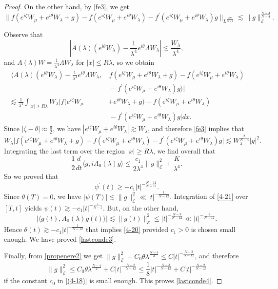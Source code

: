 \documentclass[10pt,a4paper]{amsart}
\begin{document}
\begin{proof}
On the other hand, by \eqref{fe3}, we get
$$\|f(e^{i\zeta}W_\mu +e^{i\theta} W_\lambda +g) - f (e^{i\zeta}W_\mu +e^{i\theta} W_\lambda) - f^\prime (e^{i\zeta} W_\mu +e^{i\theta} W_\lambda) g \|_{L^{\frac{2N}{N+4}}} \lesssim \|g\|_{\mathcal{E}}^{\frac{N+4}{N-4}}. $$

Observe that
$$|A(\lambda)(e^{i\theta} W_\lambda ) - \frac{1}{\lambda^4} e^{i\theta} \Lambda W_\lambda| \lesssim \frac{W_\lambda}{\lambda^4},$$
and $A(\lambda ) W = \frac{1}{\lambda^4} \Lambda W_\lambda$ for $|x|\leq R \lambda$, so we obtain
\begin{align*}
\big|\big\langle A(\lambda) (e^{i\theta }W_\lambda)- \frac{1}{\lambda^4} e^{i\theta}\Lambda W_\lambda,&\, f(e^{i\zeta}W_\mu +e^{i\theta} W_\lambda +g)- f (e^{i\zeta} W_\mu +e^{i\theta} W_\lambda)\\
&\, - f^\prime (e^{i\zeta} W_\mu +e^{i\theta} W_\lambda)g\big\rangle\big|\\
 \lesssim \frac{1}{\lambda^4} \int_{|x|\geq R\lambda} W_\lambda\big|f(e^{i\zeta}W_\mu &+e^{i\theta} W_\lambda +g)- f (e^{i\zeta} W_\mu +e^{i\theta} W_\lambda)\\
&\, - f^\prime (e^{i\zeta} W_\mu +e^{i\theta} W_\lambda)g \big| dx.
\end{align*}
Since $|\zeta -\theta|\approx \frac{\pi}{2} $, we have $|e^{i\zeta}W_\mu + e^{i\theta}W_\lambda | \gtrsim W_\lambda $, and therefore \eqref{fe3} implies that
$$W_\lambda \big|f(e^{i\zeta}W_\mu +e^{i\theta} W_\lambda +g)- f (e^{i\zeta} W_\mu +e^{i\theta} W_\lambda) - f^\prime (e^{i\zeta} W_\mu +e^{i\theta} W_\lambda)g\big| \lesssim W_\lambda^{\frac{8}{N-4}} |g|^2 .$$
Integrating the last term over the region $|x|\geq R\lambda$, we find overall that
$$\frac{1}{2} \dfrac{d}{dt} \langle g ,iA_0 (\lambda ) g \rangle \leq \frac{c_1}{2\lambda^4 } \|g\|_{\mathcal{E}}^2 +\dfrac{K}{\lambda^4}.$$
So we proved that 
\[
\psi^\prime (t) \geq - c_1 |t|^{-\frac{N-11}{N-12}}.
\]
Since $\theta (T)=0 $, we have $|\psi (T)|\lesssim \|g\|_{\mathcal{E}}^2\ll |t|^{-\frac{1}{N-12}} $. Integration of \eqref{4-21} over $[T,t]$ yields $\psi(t) \gtrsim -c_1|t|^{-\frac{1}{N-1}}$. But, on the other hand,
$$|\langle g(t) , A_0 (\lambda ) g(t) \rangle| \lesssim \|g(t)\|_{\mathcal{E}}^2\le |t|^{-\frac{N-3}{N-12}}
\ll |t|^{-\frac{1}{N-12}}.$$
Hence $\theta (t) \gtrsim -c_1|t|^{-\frac{1}{N-12}}$ that implies \eqref{4-20} provided $c_1>0$ is chosen small enough. We have proved \eqref{lastconde3}.

Finally, from \eqref{propenere2} we get
$\|g\|_{\mathcal{E}}^2 +C_0 \theta \lambda^{\frac{N-4}{2}}\le C|t|^{-\frac{N-2}{N-12}}$, and therefore
\[
\|g\|_{\mathcal{E}}^2 \le C_0 \theta \lambda^{\frac{N-4}{2}} +C|t|^{-\frac{N-2}{N-12}}\le \frac{1}{8}|t|^{-\frac{N-3}{N-12}} +C|t|^{-\frac{N-2}{N-12}}
\]
if the constant $c_0$ in \eqref{(4-18)} is small enough.
This proves \eqref{lastconde4}. 
\end{proof}
\end{document}
